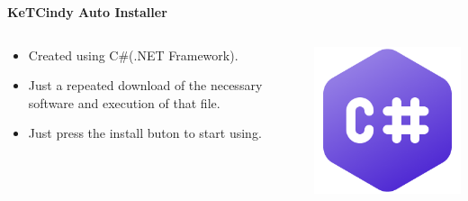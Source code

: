 \documentclass[dvipdfmx, unicode]{beamer}
\begin{document}
\begin{frame}[t]{\bfseries KeTCindy Auto Installer}
  \begin{columns}[T]
    \begin{column}{0.7\linewidth}
      \begin{itemize}
        \item Created using C\#(.NET Framework).
        \item Just a repeated download of the necessary software and execution of that file.
        \item Just press the install buton to start using.
      \end{itemize}
    \end{column}
    \begin{column}{0.3\linewidth}
      \includegraphics[width=1.0\linewidth]{img/AutoInstaller/C_Sharp_Icon.png}
    \end{column}
  \end{columns}
\end{frame}
\end{document}

